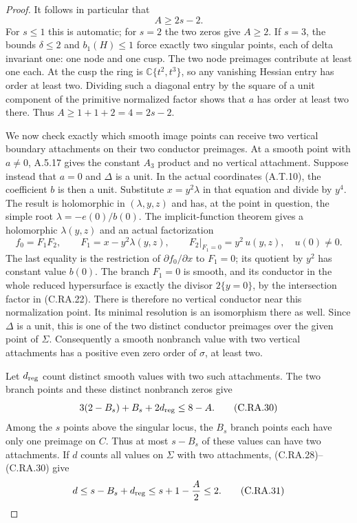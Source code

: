 \begin{proof}
It follows in particular that
\[
                              A\ge2s-2.
\tag{C.RA.28}
\]
For $s\le1$ this is automatic; for $s=2$ the two
zeros give $A\ge2$. If $s=3$, the bounds
$\delta\le2$ and $b_1(H)\le1$ force exactly two
singular points, each of delta invariant one: one node
and one cusp. The two node preimages contribute at
least one each. At the cusp the ring is
$\mathbb C\{t^2,t^3\}$, so any vanishing Hessian entry
has order at least two. Dividing such a diagonal entry
by the square of a unit component of the primitive
normalized factor shows that $a$ has order at least
two there. Thus $A\ge1+1+2=4=2s-2$.

We now check exactly which smooth image points can
receive two vertical boundary attachments on their two
conductor preimages. At a smooth point with $a\ne0$,
A.5.17 gives the constant $A_3$ product and no vertical
attachment. Suppose instead that $a=0$ and $\Delta$
is a unit. In the actual coordinates (A.T.10), the
coefficient $b$ is then a unit. Substitute $x=y^2\lambda$
in that equation and divide by $y^4$. The result is
holomorphic in $(\lambda,y,z)$ and has, at the point
in question, the simple root
$\lambda=-e(0)/b(0)$. The implicit-function theorem
gives a holomorphic $\lambda(y,z)$ and an actual
factorization
\[
 f_0=F_1F_2,\qquad
 F_1=x-y^2\lambda(y,z),\qquad
 F_2|_{F_1=0}=y^2\,u(y,z),\quad u(0)\ne0.
\tag{C.RA.29}
\]
The last equality is the restriction of
$\partial f_0/\partial x$ to $F_1=0$; its quotient
by $y^2$ has constant value $b(0)$.
The branch $F_1=0$ is smooth, and its conductor in the
whole reduced hypersurface is exactly the divisor
$2\{y=0\}$, by the intersection factor in
(C.RA.22). There is therefore no vertical conductor
near this normalization point. Its minimal resolution
is an isomorphism there as well. Since $\Delta$ is a
unit, this is one of the two distinct conductor
preimages over the given point of $\Sigma$.
Consequently a smooth nonbranch value with two vertical
attachments has a positive even zero order of $\sigma$,
at least two.

Let $d_{\rm reg}$ count distinct smooth values with
two such attachments. The two branch points and these
distinct nonbranch zeros give
\[
             3(2-B_s)+B_s+2d_{\rm reg}\le8-A.
\tag{C.RA.30}
\]
Among the $s$ points above the singular locus, the
$B_s$ branch points each have only one preimage on
$C$. Thus at most $s-B_s$ of these values can have
two attachments. If $d$ counts all values on
$\Sigma$ with two attachments, (C.RA.28)--(C.RA.30)
give
\[
 d\le s-B_s+d_{\rm reg}
       \le s+1-\frac A2\le2.
\tag{C.RA.31}
\]


\end{proof}
